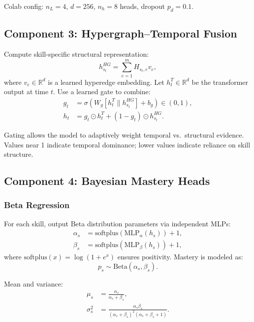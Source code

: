 \documentclass[preprint,12pt]{elsarticle}
\begin{document}
Colab config: $n_L = 4$, $d = 256$, $n_h = 8$ heads, dropout $p_d = 0.1$.

\subsection{Component 3: Hypergraph--Temporal Fusion}

Compute skill-specific structural representation:
\begin{equation}
h^{HG}_{s_t} = \sum_{e=1}^{m} H_{s_t,e} v_e,
\label{eq:hyperedge-state}
\end{equation}
where $v_e \in \mathbb{R}^d$ is a learned hyperedge embedding. Let $h^T_t \in \mathbb{R}^d$ be the transformer output at time $t$. Use a learned gate to combine:
\begin{align}
g_t &= \sigma(W_g [h^T_t \| h^{HG}_{s_t}] + b_g) \in (0, 1),\label{eq:gate}\\
h_t &= g_t \odot h^T_t + (1 - g_t) \odot h^{HG}_{s_t}.
\label{eq:fusion}
\end{align}

Gating allows the model to adaptively weight temporal vs.\ structural evidence. Values near 1 indicate temporal dominance; lower values indicate reliance on skill structure.

\subsection{Component 4: Bayesian Mastery Heads}\label{subsec:bayesian}

\subsubsection{Beta Regression}

For each skill, output Beta distribution parameters via independent MLPs:
\begin{align}
\alpha_s &= \text{softplus}(\text{MLP}_\alpha(h_s)) + 1,\label{eq:alpha}\\
\beta_s &= \text{softplus}(\text{MLP}_\beta(h_s)) + 1,\label{eq:beta}
\end{align}
where $\text{softplus}(x) = \log(1 + e^x)$ ensures positivity. Mastery is modeled as:
\begin{equation}
p_s \sim \text{Beta}(\alpha_s, \beta_s).
\label{eq:beta-dist}
\end{equation}

Mean and variance:
\begin{align}
\mu_s &= \frac{\alpha_s}{\alpha_s + \beta_s},\label{eq:beta-mean}\\
\sigma_s^2 &= \frac{\alpha_s \beta_s}{(\alpha_s + \beta_s)^2(\alpha_s + \beta_s + 1)}.\label{eq:beta-var}
\end{align}
\end{document}
